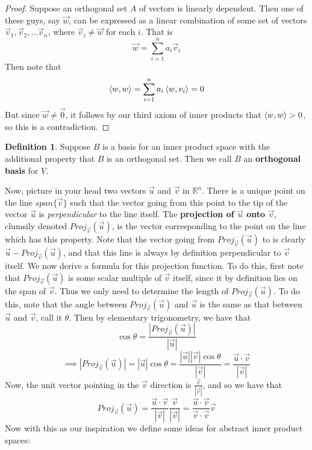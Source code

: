 \documentclass{article}
\theoremstyle{definition}
\newtheorem{definition}{Definition}[section]
\theoremstyle{plain}
\theoremstyle{theorem}
\begin{document}
\begin{proof}
	Suppose an orthogonal set $A$ of vectors is linearly dependent. Then one of these guys, say $\vec{w}$, can be expressed as a linear combination of some set of vectors $\vec{v}_1,\vec{v}_2,...\vec{v}_n$, where $\vec{v}_i \neq \vec{w}$ for each $i$. That is
	\[ \vec{w} = \sum_{i=1}^n a_i\vec{v}_i \]
	Then note that
	\begin{align*}
		\braket{w,w} = \sum_{i=1}^na_i\braket{w,v_i} = 0
	\end{align*} 
	But since $\vec{w} \neq \vec{0}$, it follows by our third axiom of inner products that $\braket{w,w} > 0$, so this is a contradiction.
\end{proof}
\begin{definition}
	Suppose $B$ is a basis for an inner product space with the additional property that $B$ is an orthogonal set. Then we call $B$ an \textbf{orthogonal basis} for $V$. 
\end{definition}
Now, picture in your head two vectors $\vec{u}$ and $\vec{v}$ in $\mathbb{R}^n$. There is a unique point on the line $span\{\vec{v}\}$ such that the vector going from this point to the tip of the vector $\vec{u}$ is \textit{perpendicular}
 to the line itself. The \textbf{projection of $\vec{u}$ onto $\vec{v}$}, clumsily denoted $Proj_{\vec{v}}(\vec{u})$, is the vector corresponding to the point on the line which has this property. Note that the vector going from $Proj_{\vec{v}}(\vec{u})$ to is clearly $\vec{u}-Proj_{\vec{v}}(\vec{u})$, and that this line is always by definition perpendicular to $\vec{v}$ itself. We now derive a formula for this projection function. To do this, first note that $Proj_{\vec{v}}(\vec{u})$ is some scalar multiple of $\vec{v}$ itself, since it by definition lies on the span of $\vec{v}$. Thus we only need to determine the length of $Proj_{\vec{v}}(\vec{u})$. To do this, note that the angle between $Proj_{\vec{v}}(\vec{u})$ and $\vec{u}$ is the same as that between $\vec{u}$ and $\vec{v}$, call it $\theta$. Then by elementary trigonometry, we have that 
\[ \cos\theta = \frac{|Proj_{\vec{v}}(\vec{u})|}{|\vec{u}|} \]
\[ \implies |Proj_{\vec{v}}(\vec{u})| = |\vec{u}|\cos\theta = \frac{|\vec{u}||\vec{v}|\cos\theta}{|\vec{v}|} = \frac{\vec{u}\cdot\vec{v}}{|\vec{v}|} \]
Now, the unit vector pointing in the $\vec{v}$ direction is $\frac{\vec{v}}{|\vec{v}|}$, and so we have that
\[ Proj_{\vec{v}}(\vec{u}) = \frac{\vec{u}\cdot\vec{v}}{|\vec{v}|}\frac{\vec{v}}{|\vec{v}|} = \frac{\vec{u}\cdot\vec{v}}{\vec{v}\cdot\vec{v}}\vec{v} \]
Now with this as our inspiration we define some ideas for abstract inner product spaces:
\end{document}
